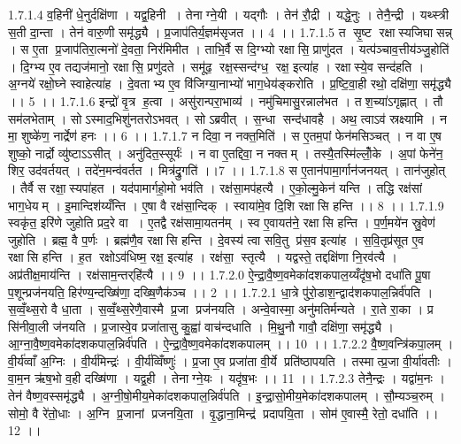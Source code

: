 1.7.1.4
व॒हिनी॑ धे॒नुर्दक्षि॑णा । यद्व॒हिनी । तेनाग्ने॒यी । यद्गौः । तेन॑ रौ॒द्री । यद्धे॒नुः । तेनै॒न्द्री । यथ्स्त्री स॒ती दा॒न्ता । तेन॑ वारु॒णी समृ॑द्ध्यै । प्र॒जाप॑तिर्य॒ज्ञम॑सृजत ।। 4 ।।
1.7.1.5
त सृ॒ष्ट रक्षा॑स्यजिघासन्न् । स ए॒ता प्र॒जाप॑तिरा॒त्मनो॑ दे॒वता॒ निर॑मिमीत । ताभि॒र्वै स दि॒ग्भ्यो रक्षा॑सि॒ प्राणु॑दत । यत्प॑ञ्चाव॒त्तीय॑ञ्जु॒होति॑ । दि॒ग्भ्य ए॒व तद्यज॑मानो॒ रक्षा॑सि॒ प्रणु॑दते । समू॑ढ॒॒ रक्ष॒स्सन्द॑ग्ध॒॒ रक्ष॒ इत्या॑ह । रक्षा॑स्ये॒व सन्द॑हति । अ॒ग्नये॑ रक्षो॒घ्ने स्वाहेत्या॑ह । दे॒वताभ्य ए॒व वि॑जिग्या॒नाभ्यो॑ भाग॒धेय॑ङ्करोति । प्र॒ष्टि॒वा॒ही रथो॒ दक्षि॑णा॒ समृ॑द्ध्यै ।। 5 ।।
1.7.1.6
इन्द्रो॑ वृ॒त्र ह॒त्वा । असु॑रान्परा॒भाव्य॑ । नमु॑चिमासु॒रन्नाल॑भत । तश॒च्या॑ऽगृह्णात् । तौ सम॑लभेताम् । सोऽस्माद॒भिशु॑नतरोऽभवत् । सोऽब्रवीत् । स॒न्धा सन्द॑धावहै । अथ॒ त्वाऽव॑ स्रक्ष्यामि । न मा॒ शुष्के॑ण॒ नार्द्रेण॑ हनः ।। 6 ।।
1.7.1.7
न दिवा॒ न नक्त॒मिति॑ । स ए॒तम॒पां फेन॑मसिञ्चत् । न वा ए॒ष शुष्को॒ नार्द्रो व्यु॑ष्टाऽऽसीत् । अनु॑दित॒स्सूर्यः॑ । न वा ए॒तद्दिवा॒ न नक्तम् । तस्यै॒तस्मि॑ल्लोँ॒के । अ॒पां फेने॑न॒ शिर॒ उद॑वर्तयत् । तदे॑न॒मन्व॑वर्तत । मित्र॑द्रु॒गति॑ ।।7 ।।
1.7.1.8
स ए॒तान॑पामा॒र्गान॑जनयत् । तान॑जुहोत् । तैर्वै स रक्षा॒॒स्यपा॑हत । यद॑पामार्गहो॒मो भव॑ति । रक्ष॑सा॒मप॑हत्यै । ए॒को॒ल्मु॒केन॑ यन्ति । तद्धि रक्ष॑सां भाग॒धेयम् । इ॒मान्दिश॑य्यँन्ति । ए॒षा वै रक्ष॑सा॒न्दिक् । स्वाया॑मे॒व दि॒शि रक्षा॑सि हन्ति ।। 8 ।।
1.7.1.9
स्वकृ॑त॒ इरि॑णे जुहोति प्रद॒रे वा । ए॒तद्वै रक्ष॑सामा॒यतन॑म् । स्व ए॒वायत॑ने॒ रक्षा॑सि हन्ति । प॒र्ण॒मये॑न स्रु॒वेण॑ जुहोति । ब्रह्म॒ वै प॒र्णः । ब्रह्म॑णै॒व रक्षा॑सि हन्ति । दे॒वस्य॑ त्वा सवि॒तु प्र॑स॒व इत्या॑ह । स॒वि॒तृप्र॑सूत ए॒व रक्षा॑सि हन्ति । ह॒त रक्षोऽव॑धिष्म॒ रक्ष॒ इत्या॑ह । रक्ष॑सा॒॒ स्तृत्यै । यद्वस्ते॒ तद्दक्षि॑णा नि॒रव॑त्यै । अप्र॑तीक्ष॒माय॑न्ति । रक्ष॑साम॒न्तर्‌हि॑त्यै ।। 9 ।।
1.7.2.0
ऐ॒न्द्रा॒वै॒ष्ण॒वमेका॑दशकपाल॒य्यँदृ॑ष॒भो दधा॑ति पू॒षा प॒शून्प्रज॑नयति॒ हिर॑ण्य॒न्दख्षि॑णा॒ दख्षि॒णैक॑ञ्च ।। 2 ।।
1.7.2.1
धा॒त्रे पु॑रो॒डाश॒न्द्वाद॑शकपाल॒न्निर्व॑पति । स॒व्वँ॒थ्स॒रो वै धा॒ता । स॒व्वँ॒थ्स॒रेणै॒वास्मै प्र॒जा प्रज॑नयति । अन्वे॒वास्मा॒ अनु॑मतिर्मन्यते । रा॒ते रा॒का । प्र सि॑नीवा॒ली ज॑नयति । प्र॒जास्वे॒व प्रजा॑तासु कु॒ह्वा॑ वाच॑न्दधाति । मि॒थु॒नौ गावौ॒ दक्षि॑णा॒ समृ॑द्ध्यै । आ॒ग्ना॒वै॒ष्ण॒वमेका॑दशकपाल॒न्निर्व॑पति । ऐ॒न्द्रा॒वै॒ष्ण॒वमेका॑दशकपालम् ।। 10 ।।
1.7.2.2
वै॒ष्ण॒वन्त्रि॑कपा॒लम् । वी॒र्य॑व्वाँ अ॒ग्निः । वी॒र्य॑मिन्द्रः॑ । वी॒र्य॑व्विँष्णुः॑ । प्र॒जा ए॒व प्रजा॑ता वी॒र्ये प्रति॑ष्ठापयति । तस्मात्प्र॒जा वी॒र्या॑वतीः । वा॒म॒न ऋ॑ष॒भो व॒ही दख्षि॑णा । यद्व॒ही । तेनाग्ने॒यः । यदृ॑ष॒भः ।। 11 ।।
1.7.2.3
तेनै॒न्द्रः । यद्वा॑म॒नः । तेन॑ वैष्ण॒वस्समृ॑द्ध्यै । अ॒ग्नी॒षो॒मीय॒मेका॑दशकपाल॒न्निर्व॑पति । इ॒न्द्रा॒सो॒मीय॒मेका॑दशकपालम् । सौ॒म्यञ्च॒रुम् । सोमो॒ वै रे॑तो॒धाः । अ॒ग्नि प्र॒जानां प्रजनयि॒ता । वृ॒द्धाना॒मिन्द्र॑ प्रदापयि॒ता । सोम॑ ए॒वास्मै॒ रेतो॒ दधा॑ति ।। 12 ।।
